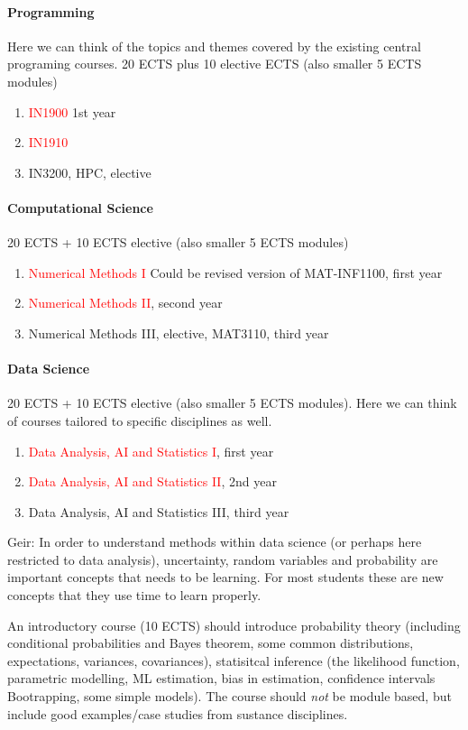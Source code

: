 \documentclass[oneside,final,10pt]{article}
\begin{document}
\paragraph{Programming}
Here we can think of the topics and themes covered by the existing central programing courses.
20 ECTS plus 10 elective ECTS (also smaller 5 ECTS modules)
\begin{enumerate}
    \item \textcolor{red}{IN1900} 1st year
    \item \textcolor{red}{IN1910}
    \item IN3200, HPC, elective
\end{enumerate}


\paragraph{Computational Science}
20 ECTS + 10 ECTS elective (also smaller 5 ECTS modules)
\begin{enumerate}
    \item \textcolor{red}{Numerical Methods I} Could be revised version of MAT-INF1100, first year
    \item \textcolor{red}{Numerical Methods II}, second year
    \item Numerical Methods III, elective, MAT3110, third year
\end{enumerate}

\paragraph{Data Science}
20 ECTS + 10 ECTS elective (also smaller 5 ECTS modules). Here we can think of courses tailored to specific disciplines as well. 
\begin{enumerate}
    \item \textcolor{red}{Data Analysis, AI and Statistics I}, first year
    \item \textcolor{red}{Data Analysis, AI and Statistics II}, 2nd year
    \item Data Analysis, AI and Statistics III, third year
\end{enumerate}

Geir: In order to understand methods within data science (or perhaps here restricted to data analysis), uncertainty, random variables and probability are important concepts that needs to be learning. For most students these are new concepts that they use time to learn properly. 

An introductory course (10 ECTS) should introduce probability theory (including conditional probabilities and Bayes theorem, some common distributions, expectations, variances, covariances), statisitcal inference (the likelihood function, parametric modelling, ML estimation, bias in estimation, confidence intervals Bootrapping, some simple models). The course should \emph{not} be module based, but include good examples/case studies from sustance disciplines.
\end{document}
